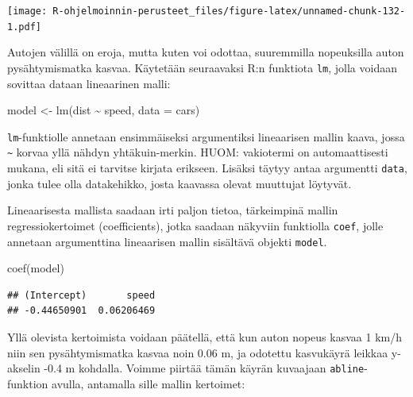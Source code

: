 \documentclass[
]{book}
\newenvironment{Shaded}{\begin{snugshade}}{\end{snugshade}}
\newcommand{\AttributeTok}[1]{\textcolor[rgb]{0.77,0.63,0.00}{#1}}
\newcommand{\DecValTok}[1]{\textcolor[rgb]{0.00,0.00,0.81}{#1}}
\newcommand{\FunctionTok}[1]{\textcolor[rgb]{0.00,0.00,0.00}{#1}}
\newcommand{\NormalTok}[1]{#1}
\newcommand{\OtherTok}[1]{\textcolor[rgb]{0.56,0.35,0.01}{#1}}
\newcommand{\SpecialCharTok}[1]{\textcolor[rgb]{0.00,0.00,0.00}{#1}}
\newcommand{\StringTok}[1]{\textcolor[rgb]{0.31,0.60,0.02}{#1}}
\begin{document}
\texttt{[image: R-ohjelmoinnin-perusteet\_files/figure-latex/unnamed-chunk-132-1.pdf]}

Autojen välillä on eroja, mutta kuten voi odottaa, suuremmilla nopeuksilla auton pysähtymismatka kasvaa. Käytetään seuraavaksi R:n funktiota \texttt{lm}, jolla voidaan sovittaa dataan lineaarinen malli:

\begin{Shaded}
\begin{Highlighting}[]
\NormalTok{model }\OtherTok{\textless{}{-}} \FunctionTok{lm}\NormalTok{(dist }\SpecialCharTok{\textasciitilde{}}\NormalTok{ speed, }\AttributeTok{data =}\NormalTok{ cars)}
\end{Highlighting}
\end{Shaded}

\texttt{lm}-funktiolle annetaan ensimmäiseksi argumentiksi lineaarisen mallin kaava, jossa \texttt{\textasciitilde{}} korvaa yllä nähdyn yhtäkuin-merkin. HUOM: vakiotermi on automaattisesti mukana, eli sitä ei tarvitse kirjata erikseen. Lisäksi täytyy antaa argumentti \texttt{data}, jonka tulee olla datakehikko, josta kaavassa olevat muuttujat löytyvät.

Lineaarisesta mallista saadaan irti paljon tietoa, tärkeimpinä mallin regressiokertoimet (coefficients), jotka saadaan näkyviin funktiolla \texttt{coef}, jolle annetaan argumenttina lineaarisen mallin sisältävä objekti \texttt{model}.

\begin{Shaded}
\begin{Highlighting}[]
\FunctionTok{coef}\NormalTok{(model)}
\end{Highlighting}
\end{Shaded}

\begin{verbatim}
## (Intercept)       speed 
## -0.44650901  0.06206469
\end{verbatim}

Yllä olevista kertoimista voidaan päätellä, että kun auton nopeus kasvaa 1 km/h niin sen pysähtymismatka kasvaa noin 0.06 m, ja odotettu kasvukäyrä leikkaa y-akselin -0.4 m kohdalla. Voimme piirtää tämän käyrän kuvaajaan \texttt{abline}-funktion avulla, antamalla sille mallin kertoimet:

\begin{Shaded}
\end{Shaded}
\end{document}
